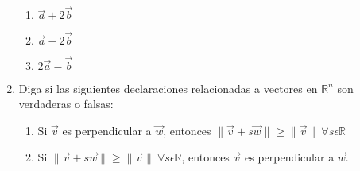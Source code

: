 \documentclass[a4paper,12pt]{article}
\begin{document}
\begin{enumerate}
\begin{enumerate}
      \item $\vec a + 2 \vec b$
      \item $\vec a - 2 \vec b$
      \item $2 \vec a - \vec b$
    \end{enumerate}
  \item Diga si las siguientes declaraciones relacionadas a vectores en $\mathbb R^n$ son verdaderas o falsas:
    \begin{enumerate}
      \item Si $\vec v$ es perpendicular a $\vec w$, entonces $\| \vec v + s \vec w \| \geq \| \vec v \| \ \forall s \epsilon \mathbb R$
      \item Si $\| \vec v + s \vec w \| \geq \| \vec v \| \ \forall s \epsilon \mathbb R$, entonces $\vec v$ es perpendicular a $\vec w$.
    \end{enumerate}
  \end{enumerate}
\end{document}

